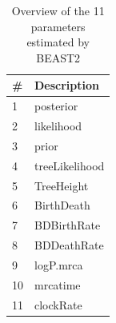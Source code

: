 \begin{table}
  \centering 
  \begin{tabular}{l l}
    \hline
    \# & Description \\
    \hline
    \hline
    1 & posterior \\
    2 & likelihood \\
    3 & prior \\
    4 & treeLikelihood \\
    5 & TreeHeight \\
    6 & BirthDeath \\
    7 & BDBirthRate \\
    8 & BDDeathRate \\
    9 & logP.mrca \\
    10 & mrcatime \\
    11 & clockRate \\
    \hline
  \end{tabular}
  \caption{
    Overview of the 11 parameters estimated by BEAST2
  }
  \label{table:estimated_parameters}
\end{table}
